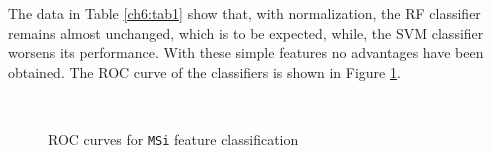 The data in Table \ref{ch6:tab1} show that, with normalization, the \Gls{RF} classifier remains almost unchanged, which is to be expected, while, the \Gls{SVM} classifier
worsens its performance. With these simple features no advantages have been obtained. The \Gls{ROC} curve of the classifiers is shown in Figure \ref{ch6:fig1}.

\begin{figure}[!htb]
  \centering
    \hspace{1mm}
    \\
    \hspace{1mm}
    \caption{ROC curves for \texttt{MSi} feature classification}
    \label{ch6:fig1}
\end{figure}

